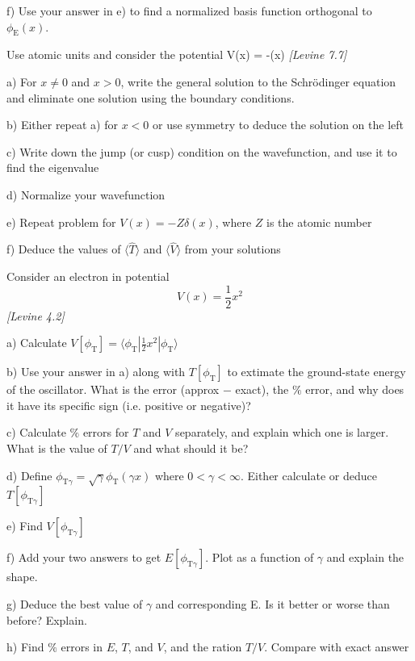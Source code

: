 f) Use your answer in e) to find a normalized basis function
orthogonal to $\phi_{\text{E}}(x)$.

\newpage


Use atomic units and consider the potential
\be
   V(x) = -\delta(x)
\ee
{\em [Levine 7.7]}

a) For $x\neq 0$ and $x > 0$, write the general solution to the Schr{\"o}dinger equation
and eliminate one solution using the  boundary conditions.

b) Either repeat a) for $x<0$ or use symmetry to deduce the solution on the left

c) Write down the jump (or cusp) condition on the wavefunction, and use it to find the
eigenvalue

d) Normalize your wavefunction

e) Repeat problem for $V(x) = -Z\delta(x)$, where $Z$ is the atomic number

f) Deduce the values of $\langle \hat{T} \rangle$ and $\langle \hat{V} \rangle$ from your
solutions

\newpage
{}
Consider an electron in potential $$V(x) = \frac{1}{2}x^2$$
{\em [Levine 4.2]}

a) Calculate $V[\phi_{\text{T}}] = \langle\phi_{\text{T}}|\frac{1}{2}x^2|\phi_{\text{T}}\rangle$

b) Use your answer in a) along with $T[\phi_{\text{T}}]$ to extimate the ground-state
energy of the oscillator. What is the error (approx $-$ exact), the $\%$ error, and
why does it have its specific sign (i.e. positive or negative)?

c) Calculate $\%$ errors for $T$ and $V$ separately, and explain which one is
larger. What is the value of $T/V$ and what should it be?

d) Define $\phi_{\text{T}\gamma} = \sqrt{\gamma}\phi_{\text{T}}(\gamma x)$ where
$0 < \gamma < \infty$. Either calculate or deduce $T[\phi_{\text{T}\gamma}]$

e) Find $V[\phi_{\text{T}\gamma}]$

f) Add your two answers to get $E[\phi_{\text{T}\gamma}]$. Plot as a
function of $\gamma$ and explain the shape.

g) Deduce the best value of $\gamma$ and corresponding E. Is
it better or worse than before? Explain.

h) Find $\%$ errors in $E$, $T$, and $V$, and the ration $T/V$. Compare
with exact answer

